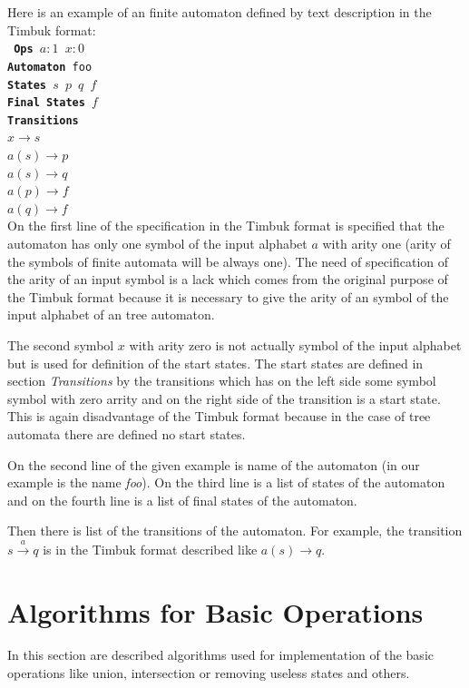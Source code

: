 Here is an example of an finite automaton defined by text description in the Timbuk format:\\
\texttt {
  \textbf{Ops} $a:1$ $x:0$\\
  \textbf{Automaton} foo\\
  \textbf{States} $s$ $p$ $q$ $f$\\
  \textbf{Final States} $f$\\
  \textbf{Transitions}\\
  \indent $x \rightarrow s$\\
  \indent $a(s) \rightarrow p$\\
  \indent $a(s) \rightarrow q$\\
  \indent $a(p) \rightarrow f$\\
  \indent $a(q) \rightarrow f$\\
}
On the first line of the specification in the Timbuk format
is specified that the automaton has only one symbol of the input alphabet $a$ with arity one (arity of the symbols of finite automata will
be always one). 
The need of specification of the arity of an input symbol is a lack which comes from the original purpose of the Timbuk format because it is necessary 
to give the arity of an symbol of the input alphabet of an tree automaton.

The second symbol $x$ with arity zero is not actually symbol of the input alphabet but is used for definition of the start states. The
start states are defined in section \emph{Transitions} by the transitions which has on the left side some symbol symbol with zero arrity and on the
right side of the transition is a start state. This is again disadvantage
of the Timbuk format because in the case of tree automata there are defined no start states.

On the second line of the given example is name of the automaton (in our example is the name \emph{foo}). 
On the third line is a list of states of the automaton and on the fourth line is a list of final states of the automaton.

Then there is list of the transitions of the automaton. 
For example, the transition $s \xrightarrow{a} q$ is in the Timbuk format described like $a(s)\rightarrow q$.

\section{Algorithms for Basic Operations}
In this section are described algorithms used for implementation of the basic operations like union, intersection or removing useless states and others. 

